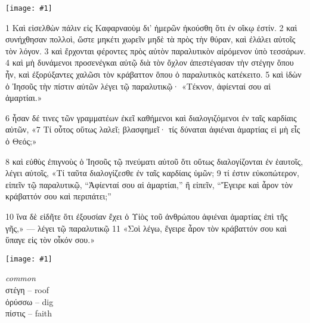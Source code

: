 \documentclass[10pt,a5paper,twoside,twocolumn]{book}
\newcommand{\newchapter}{\stepcounter{chapter}}
\newcommand{\fig}[1]{\texttt{[image: \#1]}\label{fig:#1}}
\newcommand*\cleartoleftpage{%
  \ifodd\value{page}\hbox{}\clearpage\fi
}
\newenvironment{facing}{\cleartoleftpage}{\clearpage\pagebreak}
\newenvironment{help}{\clearpage}{}
\newenvironment{helpsec}{\begin{minipage}[t]{\textwidth}\begin{multicols}{2}}{\end{multicols}\end{minipage}}
\newenvironment{vocab}{\begin{helpsec}}{\end{helpsec}}
\begin{document}

\newchapter

\begin{facing}

\fig{02-04} %

	1 Καὶ εἰσελθὼν πάλιν εἰς Καφαρναοὺμ δι’ ἡμερῶν ἠκούσθη ὅτι ἐν οἴκῳ ἐστίν. 2 καὶ συνήχθησαν πολλοὶ, ὥστε μηκέτι χωρεῖν μηδὲ τὰ πρὸς τὴν θύραν, καὶ ἐλάλει αὐτοῖς τὸν λόγον. 3 καὶ ἔρχονται φέροντες πρὸς αὐτὸν παραλυτικὸν αἰρόμενον ὑπὸ τεσσάρων. 4 καὶ μὴ δυνάμενοι προσενέγκαι αὐτῷ διὰ τὸν ὄχλον ἀπεστέγασαν τὴν στέγην ὅπου ἦν, καὶ ἐξορύξαντες χαλῶσι τὸν κράβαττον ὅπου ὁ παραλυτικὸς κατέκειτο. 
5 καὶ ἰδὼν ὁ Ἰησοῦς τὴν πίστιν αὐτῶν λέγει τῷ παραλυτικῷ· «Τέκνον, ἀφίενταί σου αἱ ἁμαρτίαι.»

 6 ἦσαν δέ τινες τῶν γραμματέων ἐκεῖ καθήμενοι καὶ διαλογιζόμενοι ἐν ταῖς καρδίαις αὐτῶν, «7 Τί οὗτος οὕτως λαλεῖ; βλασφημεῖ· τίς δύναται ἀφιέναι ἁμαρτίας εἰ μὴ εἷς ὁ Θεός;»

8 καὶ εὐθὺς ἐπιγνοὺς ὁ Ἰησοῦς τῷ πνεύματι αὐτοῦ ὅτι οὕτως διαλογίζονται ἐν ἑαυτοῖς, λέγει αὐτοῖς, «Τί ταῦτα διαλογίζεσθε ἐν ταῖς καρδίαις ὑμῶν; 
9 τί ἐστιν εὐκοπώτερον, εἰπεῖν τῷ παραλυτικῷ, ``Ἀφίενταί σου αἱ ἁμαρτίαι,'' ἢ εἰπεῖν, ``Ἔγειρε καὶ ἆρον τὸν κράβαττόν σου καὶ περιπάτει;''

10 ἵνα δὲ εἰδῆτε ὅτι ἐξουσίαν ἔχει ὁ Υἱὸς τοῦ ἀνθρώπου ἀφιέναι ἁμαρτίας ἐπὶ τῆς γῆς,» — λέγει τῷ παραλυτικῷ 11 «Σοὶ λέγω, ἔγειρε ἆρον τὸν κράβαττόν σου καὶ ὕπαγε εἰς τὸν οἶκόν σου.»

\fig{02-06} %



\begin{help}
\begin{vocab}

\emph{common}\\
στέγη -- roof \\
ὀρύσσω -- dig \\
πίστις -- faith \\


\end{vocab}
\end{help}
\end{facing}
\end{document}
